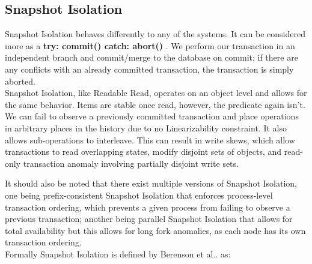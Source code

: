\documentclass[a4paper,10pt,titlepage]{report}
\begin{document}

\newpage
\subsection{Snapshot Isolation}

Snapshot Isolation behaves differently to any of the systems. It can be considered more as a \textbf{try: commit() catch: abort()} . We perform our transaction in an independent branch and commit/merge to the database on commit; if there are any conflicts with an already committed transaction, the transaction is simply aborted.
\\ \vspace{5mm}
Snapshot Isolation, like Readable Read, operates on an object level and allows for the same behavior. Items are stable once read, however, the predicate again isn't. We can fail to observe a previously committed transaction and place operations in arbitrary places in the history due to no Linearizability constraint. It also allows sub-operations to interleave. This can result in write skews, which allow transactions to read overlapping states, modify disjoint sets of objects, and read-only transaction anomaly involving partially disjoint write sets.
\\ \vspace{5mm}

It should also be noted that there exist multiple versions of Snapshot Isolation, one being prefix-consistent Snapshot Isolation that enforces process-level transaction ordering, which prevents a given process from failing to observe a previous transaction; another being parallel Snapshot Isolation that allows for total availability but this allows for long fork anomalies, as each node has its own transaction ordering.
\\ \vspace{5mm}
Formally Snapshot Isolation is defined by Berenson et al.\cite{Berensonetal}. as:
\end{document}
